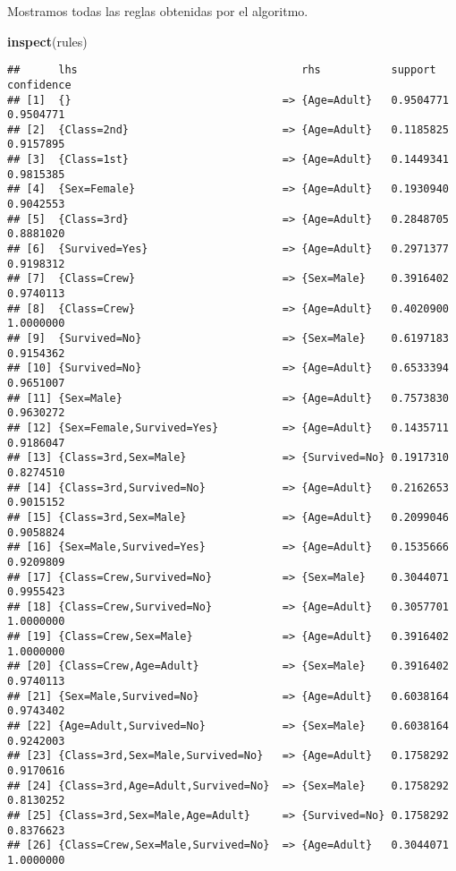 \documentclass[]{article}
\newenvironment{Shaded}{\begin{snugshade}}{\end{snugshade}}
\newcommand{\KeywordTok}[1]{\textcolor[rgb]{0.13,0.29,0.53}{\textbf{#1}}}
\newcommand{\NormalTok}[1]{#1}
\begin{document}
Mostramos todas las reglas obtenidas por el algoritmo.

\begin{Shaded}
\begin{Highlighting}[]
\KeywordTok{inspect}\NormalTok{(rules)}
\end{Highlighting}
\end{Shaded}

\begin{verbatim}
##      lhs                                   rhs           support   confidence
## [1]  {}                                 => {Age=Adult}   0.9504771 0.9504771 
## [2]  {Class=2nd}                        => {Age=Adult}   0.1185825 0.9157895 
## [3]  {Class=1st}                        => {Age=Adult}   0.1449341 0.9815385 
## [4]  {Sex=Female}                       => {Age=Adult}   0.1930940 0.9042553 
## [5]  {Class=3rd}                        => {Age=Adult}   0.2848705 0.8881020 
## [6]  {Survived=Yes}                     => {Age=Adult}   0.2971377 0.9198312 
## [7]  {Class=Crew}                       => {Sex=Male}    0.3916402 0.9740113 
## [8]  {Class=Crew}                       => {Age=Adult}   0.4020900 1.0000000 
## [9]  {Survived=No}                      => {Sex=Male}    0.6197183 0.9154362 
## [10] {Survived=No}                      => {Age=Adult}   0.6533394 0.9651007 
## [11] {Sex=Male}                         => {Age=Adult}   0.7573830 0.9630272 
## [12] {Sex=Female,Survived=Yes}          => {Age=Adult}   0.1435711 0.9186047 
## [13] {Class=3rd,Sex=Male}               => {Survived=No} 0.1917310 0.8274510 
## [14] {Class=3rd,Survived=No}            => {Age=Adult}   0.2162653 0.9015152 
## [15] {Class=3rd,Sex=Male}               => {Age=Adult}   0.2099046 0.9058824 
## [16] {Sex=Male,Survived=Yes}            => {Age=Adult}   0.1535666 0.9209809 
## [17] {Class=Crew,Survived=No}           => {Sex=Male}    0.3044071 0.9955423 
## [18] {Class=Crew,Survived=No}           => {Age=Adult}   0.3057701 1.0000000 
## [19] {Class=Crew,Sex=Male}              => {Age=Adult}   0.3916402 1.0000000 
## [20] {Class=Crew,Age=Adult}             => {Sex=Male}    0.3916402 0.9740113 
## [21] {Sex=Male,Survived=No}             => {Age=Adult}   0.6038164 0.9743402 
## [22] {Age=Adult,Survived=No}            => {Sex=Male}    0.6038164 0.9242003 
## [23] {Class=3rd,Sex=Male,Survived=No}   => {Age=Adult}   0.1758292 0.9170616 
## [24] {Class=3rd,Age=Adult,Survived=No}  => {Sex=Male}    0.1758292 0.8130252 
## [25] {Class=3rd,Sex=Male,Age=Adult}     => {Survived=No} 0.1758292 0.8376623 
## [26] {Class=Crew,Sex=Male,Survived=No}  => {Age=Adult}   0.3044071 1.0000000 

\end{verbatim}
\end{document}
